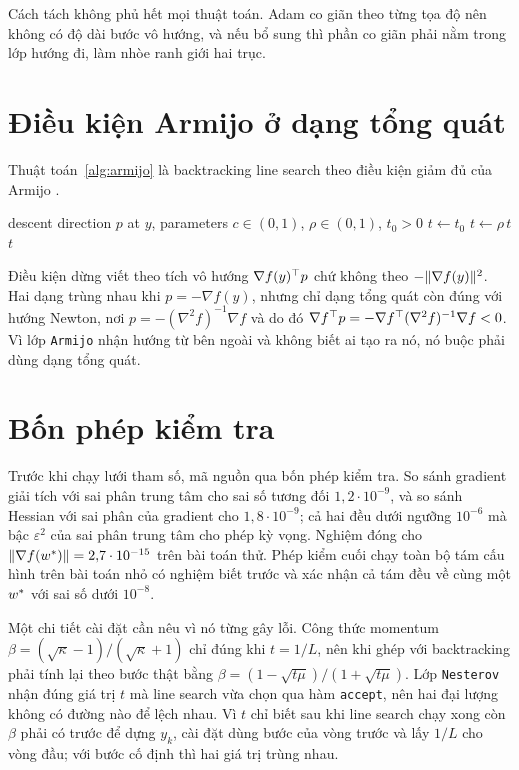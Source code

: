 \documentclass[12pt, a4paper, oneside]{report}
\theoremstyle{definition}
\begin{document}
Cách tách không phủ hết mọi thuật toán. Adam co giãn theo từng tọa độ nên không
có độ dài bước vô hướng, và nếu bổ sung thì phần co giãn phải nằm trong lớp hướng
đi, làm nhòe ranh giới hai trục.

\section{Điều kiện Armijo ở dạng tổng quát}

Thuật toán~\ref{alg:armijo} là backtracking line search theo điều kiện giảm đủ
của Armijo \cite{armijo1966minimization}.

\begin{algorithm}
  \caption{Backtracking line search (Armijo)}
  \label{alg:armijo}
  \begin{algorithmic}[1]
    \Require descent direction $p$ at $y$, parameters $c \in (0,1)$, $\rho \in (0,1)$, $t_{0} > 0$
    \State $t \gets t_{0}$
      \State $t \gets \rho\, t$
    \EndWhile
    \State \Return $t$
  \end{algorithmic}
\end{algorithm}

Điều kiện dừng viết theo tích vô hướng $\nabla f(y)^{\top} p$ chứ không theo
$-\lVert\nabla f(y)\rVert^{2}$. Hai dạng trùng nhau khi $p = -\nabla f(y)$, nhưng chỉ
dạng tổng quát còn đúng với hướng Newton, nơi
$p = -(\nabla^{2} f)^{-1} \nabla f$ và do đó
$\nabla f^{\top} p = -\nabla f^{\top} (\nabla^{2} f)^{-1} \nabla f < 0$. Vì lớp
\texttt{Armijo} nhận hướng từ bên ngoài và không biết ai tạo ra nó, nó buộc phải
dùng dạng tổng quát.

\section{Bốn phép kiểm tra}

Trước khi chạy lưới tham số, mã nguồn qua bốn phép kiểm tra. So sánh gradient
giải tích với sai phân trung tâm cho sai số tương đối $1{,}2 \cdot 10^{-9}$, và
so sánh Hessian với sai phân của gradient cho $1{,}8 \cdot 10^{-9}$; cả hai đều
dưới ngưỡng $10^{-6}$ mà bậc $\varepsilon^{2}$ của sai phân trung tâm cho phép
kỳ vọng. Nghiệm đóng cho $\lVert\nabla f(w^{*})\rVert = 2{,}7 \cdot 10^{-15}$ trên bài
toán thử. Phép kiểm cuối chạy toàn bộ tám cấu hình trên bài toán nhỏ có nghiệm
biết trước và xác nhận cả tám đều về cùng một $w^{*}$ với sai số dưới $10^{-8}$.

Một chi tiết cài đặt cần nêu vì nó từng gây lỗi. Công thức momentum
$\beta = (\sqrt{\kappa}-1)/(\sqrt{\kappa}+1)$ chỉ đúng khi $t = 1/L$, nên khi
ghép với backtracking phải tính lại theo bước thật bằng
$\beta = (1 - \sqrt{t\mu})/(1 + \sqrt{t\mu})$. Lớp \texttt{Nesterov} nhận đúng
giá trị $t$ mà line search vừa chọn qua hàm \texttt{accept}, nên hai đại lượng
không có đường nào để lệch nhau. Vì $t$ chỉ biết sau khi line search chạy xong
còn $\beta$ phải có trước để dựng $y_k$, cài đặt dùng bước của vòng trước và lấy
$1/L$ cho vòng đầu; với bước cố định thì hai giá trị trùng nhau.
\end{document}
